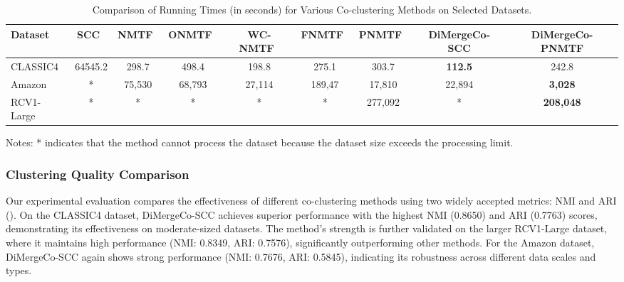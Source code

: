 \documentclass[journal]{IEEEtran}
\renewcommand{\cite}[1]{~\autocite{#1}}
\begin{document}
\begin{table}[htbp]
    \centering
    \caption{Comparison of Running Times (in seconds) for Various Co-clustering Methods on Selected Datasets.}
    \label{tab:running-time}
    \begin{tabular}{@{} l cccccccc @{}}
        \toprule
        Dataset    & SCC\cite{dhillon2001CoclusteringDocumentsWords}
                   & NMTF\cite{long2005CoclusteringBlockValue}
                   & ONMTF\cite{ding2006OrthogonalNonnegativeMatrix}
                   & WC-NMTF\cite{salah2018WordCooccurrenceRegularized}
                   & FNMTF\cite{kim2011FastNonnegativeMatrix}
                   & PNMTF\cite{chen2023ParallelNonNegativeMatrix}      & \textbf{DiMergeCo-SCC} & \textbf{DiMergeCo-PNMTF}                                                                 \\
        \midrule
        CLASSIC4   & 64545.2                                            & 298.7                  & 498.4                    & 198.8  & 275.1  & 303.7   & \textbf{112.5} & 242.8            \\
        Amazon     & *                                                  & 75,530                 & 68,793                   & 27,114 & 189,47 & 17,810  & 22,894         & \textbf{3,028}   \\
        RCV1-Large & *                                                  & *                      & *                        & *      & *      & 277,092 & *              & \textbf{208,048} \\
        \bottomrule
    \end{tabular}
    \begin{tablenotes}
        \small
        \item Notes: * indicates that the method cannot process the dataset because the dataset size exceeds the processing limit.
    \end{tablenotes}
\end{table}


\subsubsection{Clustering Quality Comparison}
Our experimental evaluation compares the effectiveness of different co-clustering methods using two widely accepted metrics: NMI and ARI (). On the CLASSIC4 dataset, DiMergeCo-SCC achieves superior performance with the highest NMI (0.8650) and ARI (0.7763) scores, demonstrating its effectiveness on moderate-sized datasets. The method's strength is further validated on the larger RCV1-Large dataset, where it maintains high performance (NMI: 0.8349, ARI: 0.7576), significantly outperforming other methods. For the Amazon dataset, DiMergeCo-SCC again shows strong performance (NMI: 0.7676, ARI: 0.5845), indicating its robustness across different data scales and types.
\end{document}
